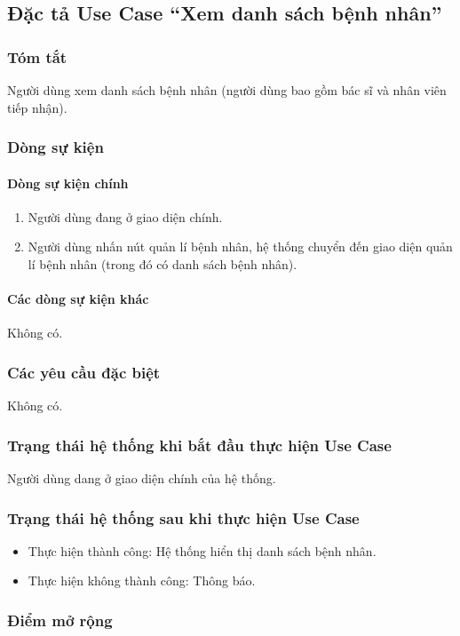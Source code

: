 \subsection{Đặc tả Use Case ``Xem danh sách bệnh nhân''}

\subsubsection{Tóm tắt}
Người dùng xem danh sách bệnh nhân (người dùng bao gồm bác sĩ và nhân viên tiếp nhận).

\subsubsection{Dòng sự kiện}
\paragraph{\textbf{Dòng sự kiện chính}}
\begin{enumerate}
  \item Người dùng đang ở giao diện chính.
  \item Người dùng nhấn nút quản lí bệnh nhân, hệ thống chuyển đến giao diện quản lí bệnh nhân (trong đó có danh sách bệnh nhân).
\end{enumerate}

\paragraph{\textbf{Các dòng sự kiện khác}}
Không có.

\subsubsection{Các yêu cầu đặc biệt}
Không có.

\subsubsection{Trạng thái hệ thống khi bắt đầu thực hiện Use Case}
Người dùng dang ở giao diện chính của hệ thống.

\subsubsection{Trạng thái hệ thống sau khi thực hiện Use Case}
\begin{itemize}
  \item Thực hiện thành công: Hệ thống hiển thị danh sách bệnh nhân.
  \item Thực hiện không thành công: Thông báo.
\end{itemize}

\subsubsection{Điểm mở rộng}
